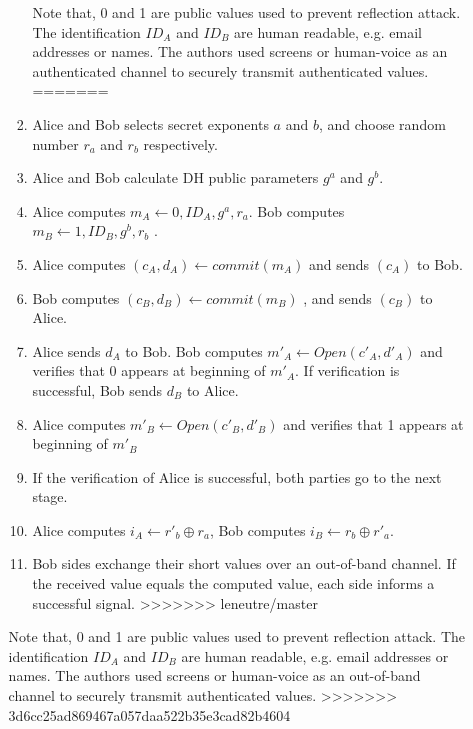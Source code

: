 \begin{enumerate}
\begin{enumerate}
\begin{enumerate}
Note that, 0 and 1 are public values used to prevent reflection attack. The identification $ID_A$ and $ID_B$ are human readable, e.g. email addresses or names. The authors used screens or human-voice as an authenticated channel to securely transmit authenticated values.
=======
\item Alice and Bob selects secret exponents $a$ and $b$, and choose random number $r_a$ and $r_b$ respectively. 
\item Alice and Bob calculate DH public parameters $g^a$ and $g^b$. 
\item Alice computes $m_A \leftarrow 0,ID_A,g^a,r_a$. Bob computes $m_B \leftarrow 1,ID_B,g^b,r_b$ .
\item Alice computes $(c_A,d_A) \leftarrow commit(m_A)$ and sends $(c_A)$ to Bob.
\item Bob computes $(c_B,d_B) \leftarrow commit(m_B)$ , and sends $(c_B)$ to Alice.
\item Alice sends $d_A$ to Bob. Bob computes $m'_A \leftarrow Open(c'_A,d'_A)$ and verifies that 0 appears at beginning of $m'_A$. If verification is successful, Bob sends $d_B$ to Alice.
\item Alice computes $m'_B \leftarrow Open(c'_B,d'_B)$ and verifies that 1 appears at beginning of $m'_B$
 \item If the verification of Alice is successful, both parties go to the next stage.
\item Alice computes $i_A \leftarrow r'_b \oplus r_a$, Bob computes $i_B \leftarrow r_b \oplus r'_a$.
\item Bob sides exchange their short values over an out-of-band channel. If the received value equals the computed value, each side informs a successful signal. 
>>>>>>> leneutre/master
\end{enumerate}

Note that, 0 and 1 are public values used to prevent reflection attack. The identification $ID_A$ and $ID_B$ are human readable, e.g. email addresses or names. The authors used screens or human-voice as an out-of-band channel to securely transmit authenticated values.
>>>>>>> 3d6cc25ad869467a057daa522b35e3cad82b4604
 

\end{enumerate}
\end{enumerate}
